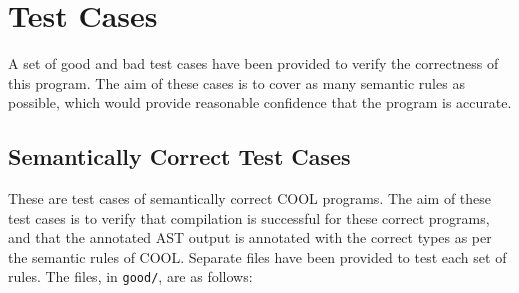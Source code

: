 \documentclass{article}
\begin{document}
\section{Test Cases}
A set of good and bad test cases have been provided to verify the correctness of this program. The aim of these cases is to cover as many semantic rules as possible, which would provide reasonable confidence that the program is accurate.

\subsection{Semantically Correct Test Cases}
These are test cases of semantically correct COOL programs. The aim of these test cases is to verify that compilation is successful for these correct programs, and that the annotated AST output is annotated with the correct types as per the semantic rules of COOL. Separate files have been provided to test each set of rules. The files, in \verb|good/|, are as follows:
\end{document}
